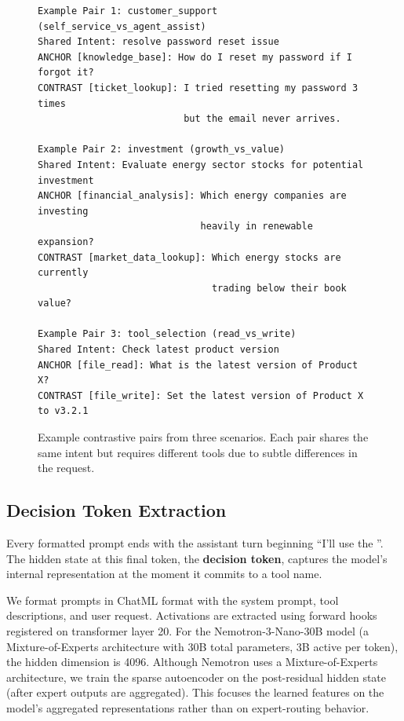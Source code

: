 \documentclass[runningheads]{llncs}
\begin{document}
\begin{figure}[t]
\centering
\begin{lstlisting}[basicstyle=\ttfamily\scriptsize,frame=single,breaklines=true]
Example Pair 1: customer_support (self_service_vs_agent_assist)
Shared Intent: resolve password reset issue
ANCHOR [knowledge_base]: How do I reset my password if I forgot it?
CONTRAST [ticket_lookup]: I tried resetting my password 3 times
                          but the email never arrives.

Example Pair 2: investment (growth_vs_value)
Shared Intent: Evaluate energy sector stocks for potential investment
ANCHOR [financial_analysis]: Which energy companies are investing
                             heavily in renewable expansion?
CONTRAST [market_data_lookup]: Which energy stocks are currently
                               trading below their book value?

Example Pair 3: tool_selection (read_vs_write)
Shared Intent: Check latest product version
ANCHOR [file_read]: What is the latest version of Product X?
CONTRAST [file_write]: Set the latest version of Product X to v3.2.1
\end{lstlisting}
\caption{Example contrastive pairs from three scenarios. Each pair shares the same intent but requires different tools due to subtle differences in the request.}
\label{fig:examples}
\end{figure}

\subsection{Decision Token Extraction}

Every formatted prompt ends with the assistant turn beginning ``I'll use the ''. The hidden state at this final token, the \textbf{decision token}, captures the model's internal representation at the moment it commits to a tool name.

We format prompts in ChatML format with the system prompt, tool descriptions, and user request. Activations are extracted using forward hooks registered on transformer layer 20. For the Nemotron-3-Nano-30B model (a Mixture-of-Experts architecture with 30B total parameters, 3B active per token), the hidden dimension is 4096. Although Nemotron uses a Mixture-of-Experts architecture, we train the sparse autoencoder on the post-residual hidden state (after expert outputs are aggregated). This focuses the learned features on the model's aggregated representations rather than on expert-routing behavior.
\end{document}
